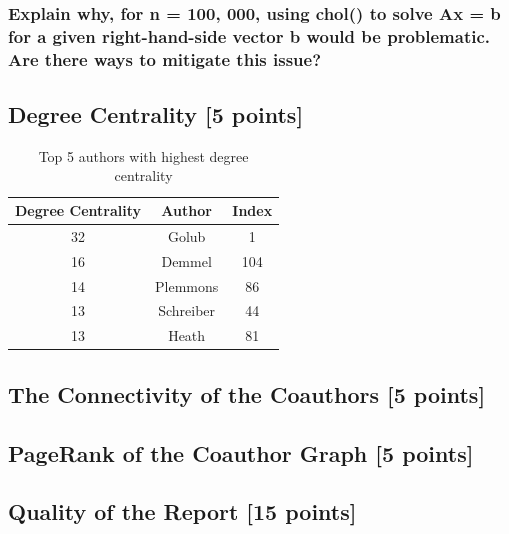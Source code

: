 \documentclass[unicode,11pt,a4paper,oneside,numbers=endperiod,openany]{scrartcl}
\begin{document}
\subsubsection{Explain why, for n = 100, 000, using chol() to solve Ax = b for a given right-hand-side vector b would be problematic. Are there ways to mitigate this issue?}


\subsection{Degree Centrality [5 points]}
\noindent
\begin{table}[H]
    \centering
    \begin{tabular}{|c|c|c|}
        \hline
        Degree Centrality & Author  & Index \\
        \hline
        32 & Golub & 1  \\
        \hline
        16    & Demmel & 104  \\
        \hline
        14     & Plemmons   & 86  \\
        \hline
        13     & Schreiber & 44  \\
        \hline
        13    & Heath & 81  \\
        \hline
    \end{tabular}
    \caption{Top 5 authors with highest degree centrality}
\end{table}

\subsection{The Connectivity of the Coauthors [5 points]}

\subsection{PageRank of the Coauthor Graph [5 points]}



\subsection{Quality of the Report [15 points]}
\end{document}
